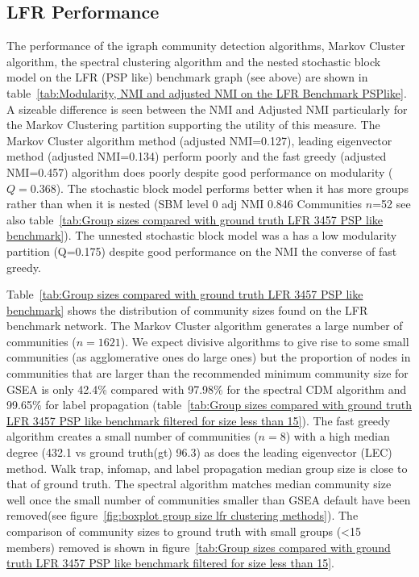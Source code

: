 



\subsection{LFR Performance}

The performance of the igraph community detection algorithms, Markov Cluster algorithm, the spectral clustering algorithm and the nested stochastic block model on the LFR (PSP like) benchmark graph (see above) are shown in table~\ref{tab:Modularity, NMI and adjusted NMI on the LFR Benchmark PSPlike}. A sizeable difference is seen between the NMI and Adjusted NMI particularly for the Markov Clustering partition supporting the utility of this measure\cite{vinh2010information}. The Markov Cluster algorithm method (adjusted NMI=0.127), leading eigenvector method (adjusted NMI=0.134) perform poorly and the fast greedy (adjusted NMI=0.457) algorithm does poorly despite good performance on modularity ($Q=$0.368). The stochastic block model performs better when it has more groups rather than when it is nested (SBM level 0 adj NMI 0.846 Communities $n$=52 see also table~\ref{tab:Group sizes compared with ground truth LFR 3457 PSP like benchmark}). The unnested stochastic block model was a has a low modularity partition (Q=0.175) despite good performance on the NMI the converse of fast greedy. 

Table~\ref{tab:Group sizes compared with ground truth LFR 3457 PSP like benchmark} shows the distribution of community sizes found on the LFR benchmark network. The Markov Cluster algorithm generates a large number of communities ($n=1621$). We expect divisive algorithms to give rise to some small communities (as agglomerative ones do large ones) but the proportion of nodes in communities that are larger than the recommended minimum community size for GSEA is only 42.4\% compared with 97.98\% for the spectral CDM algorithm and 99.65\% for label propagation (table~\ref{tab:Group sizes compared with ground truth LFR 3457 PSP like benchmark filtered for size less than 15}). The fast greedy algorithm creates a small number of communities ($n=8$) with a high median degree (432.1 vs ground truth(gt) 96.3) as does the leading eigenvector (LEC) method. Walk trap, infomap, and label propagation median group size is close to that of ground truth. The spectral algorithm matches median community size well once the small number of communities smaller than GSEA default have been removed(see figure~\ref{fig:boxplot group size lfr clustering methods}). The comparison of community sizes to ground truth with small groups (<15 members) removed is shown in figure~\ref{tab:Group sizes compared with ground truth LFR 3457 PSP like benchmark filtered for size less than 15}.



